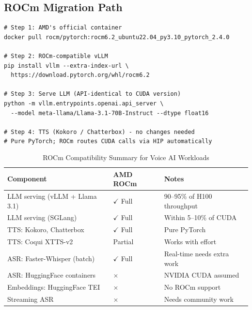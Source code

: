 \documentclass[12pt,a4paper]{article}
\begin{document}
\subsection{ROCm Migration Path}

\begin{lstlisting}[style=bash,caption={ROCm Migration for Voice AI},label=lst:rocm]
# Step 1: AMD's official container
docker pull rocm/pytorch:rocm6.2_ubuntu22.04_py3.10_pytorch_2.4.0

# Step 2: ROCm-compatible vLLM
pip install vllm --extra-index-url \
  https://download.pytorch.org/whl/rocm6.2

# Step 3: Serve LLM (API-identical to CUDA version)
python -m vllm.entrypoints.openai.api_server \
  --model meta-llama/Llama-3.1-70B-Instruct --dtype float16

# Step 4: TTS (Kokoro / Chatterbox) - no changes needed
# Pure PyTorch; ROCm routes CUDA calls via HIP automatically
\end{lstlisting}

\begin{table}[H]\centering
\caption{ROCm Compatibility Summary for Voice AI Workloads}
\label{tab:rocm-compat}
\begin{tabularx}{\textwidth}{llX}
\toprule
\textbf{Component} & \textbf{AMD ROCm} & \textbf{Notes} \\
\midrule
LLM serving (vLLM + Llama 3.1)   & $\checkmark$ Full  & 90--95\% of H100 throughput \\
LLM serving (SGLang)              & $\checkmark$ Full  & Within 5--10\% of CUDA \\
TTS: Kokoro, Chatterbox           & $\checkmark$ Full  & Pure PyTorch \\
TTS: Coqui XTTS-v2               & Partial            & Works with effort \\
ASR: Faster-Whisper (batch)       & $\checkmark$ Full  & Real-time needs extra work \\
ASR: HuggingFace containers       & $\times$           & NVIDIA CUDA assumed \\
Embeddings: HuggingFace TEI       & $\times$           & No ROCm support \\
Streaming ASR                     & $\times$           & Needs community work \\
\bottomrule
\end{tabularx}
\end{table}

\end{document}
